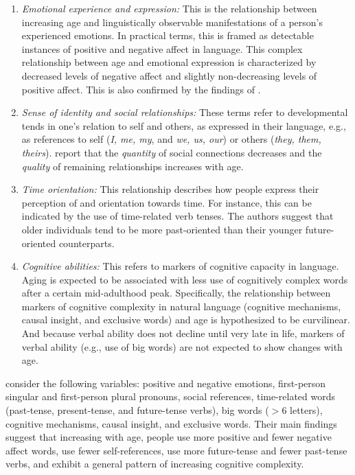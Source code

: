 \begin{enumerate}
    \item \textit{Emotional experience and expression:} This is the relationship between increasing age and linguistically observable manifestations of a person's experienced emotions. In practical terms, this is framed as detectable instances of positive and negative affect in language. This complex relationship between age and emotional expression is characterized by decreased levels of negative affect and slightly non-decreasing levels of positive affect. This is also confirmed by the findings of \cite{schler2006effects}.
    
    \item \textit{Sense of identity and social relationships:} These terms refer to developmental tends in one's relation to self and others, as expressed in their language, e.g., as references to self (\textit{I, me, my}, and \textit{we, us, our}) or others (\textit{they, them, theirs}). \cite{pennebaker2003words} report that the \textit{quantity} of social connections decreases and the \textit{quality} of remaining relationships increases with age.
    
    \item \textit{Time orientation:} This relationship describes how people express their perception of and orientation towards time. For instance, this can be indicated by the use of time-related verb tenses. The authors suggest that older individuals tend to be more past-oriented than their younger future-oriented counterparts.
    
    \item \textit{Cognitive abilities:} This refers to markers of cognitive capacity in language. Aging is expected to be associated with less use of cognitively complex words after a certain mid-adulthood peak. Specifically, the relationship between markers of cognitive complexity in natural language (cognitive mechanisms, causal insight, and exclusive words) and age is hypothesized to be curvilinear. And because verbal ability does not decline until very late in life, markers of verbal ability (e.g., use of big words) are not expected to show changes with age.
\end{enumerate}

\cite{pennebaker2003words} consider the following variables: positive and negative emotions, first-person singular and first-person plural pronouns, social references, time-related words (past-tense, present-tense, and future-tense verbs), big words ($>6$ letters), cognitive mechanisms, causal insight, and exclusive words. Their main findings suggest that increasing with age, people use more positive and fewer negative affect words, use fewer self-references, use more future-tense and fewer past-tense verbs, and exhibit a general pattern of increasing cognitive complexity.

